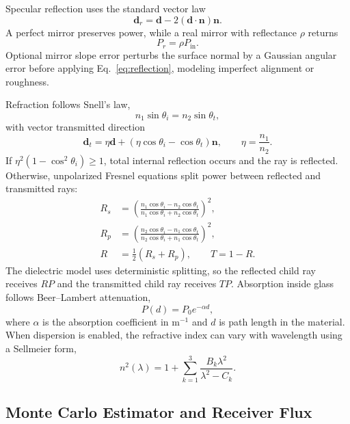 Specular reflection uses the standard vector law
\begin{equation}
  \mathbf{d}_r = \mathbf{d} - 2(\mathbf{d}\cdot\mathbf{n})\mathbf{n}.
  \label{eq:reflection}
\end{equation}
A perfect mirror preserves power, while a real mirror with reflectance $\rho$ returns
\begin{equation}
  P_r = \rho P_\mathrm{in}.
\end{equation}
Optional mirror slope error perturbs the surface normal by a Gaussian angular error before
applying Eq.~\eqref{eq:reflection}, modeling imperfect alignment or roughness.

Refraction follows Snell's law,
\begin{equation}
  n_1\sin\theta_i = n_2\sin\theta_t ,
\end{equation}
with vector transmitted direction
\begin{equation}
  \mathbf{d}_t =
  \eta\mathbf{d} + \left(\eta\cos\theta_i-\cos\theta_t\right)\mathbf{n},
  \qquad
  \eta=\frac{n_1}{n_2}.
\end{equation}
If $\eta^2(1-\cos^2\theta_i)\ge 1$, total internal reflection occurs and the ray is reflected.
Otherwise, unpolarized Fresnel equations split power between reflected and transmitted rays:
\begin{align}
  R_s &=
  \left(\frac{n_1\cos\theta_i-n_2\cos\theta_t}
             {n_1\cos\theta_i+n_2\cos\theta_t}\right)^2, \\
  R_p &=
  \left(\frac{n_2\cos\theta_i-n_1\cos\theta_t}
             {n_2\cos\theta_i+n_1\cos\theta_t}\right)^2, \\
  R &= \frac{1}{2}(R_s+R_p), \qquad T=1-R .
\end{align}
The dielectric model uses deterministic splitting, so the reflected child ray receives $RP$
and the transmitted child ray receives $TP$.  Absorption inside glass follows Beer--Lambert
attenuation,
\begin{equation}
  P(d) = P_0 e^{-\alpha d},
\end{equation}
where $\alpha$ is the absorption coefficient in m$^{-1}$ and $d$ is path length in the
material.  When dispersion is enabled, the refractive index can vary with wavelength using a
Sellmeier form,
\begin{equation}
  n^2(\lambda) = 1 + \sum_{k=1}^{3}\frac{B_k\lambda^2}{\lambda^2-C_k}.
\end{equation}

\subsection{Monte Carlo Estimator and Receiver Flux}

